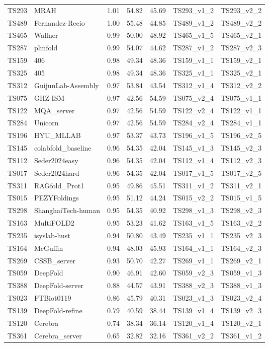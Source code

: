 \begin{table}[ht]
{\begin{tabular}{llrrrll}
TS293 & MRAH & 1.01 & 54.82 & 45.69 & TS293\_v1\_2 & TS293\_v2\_2 \\ 
TS489 & Fernandez-Recio & 1.00 & 55.48 & 44.85 & TS489\_v1\_2 & TS489\_v2\_2 \\ 
TS465 & Wallner & 0.99 & 50.00 & 48.92 & TS465\_v1\_5 & TS465\_v2\_1 \\ 
TS287 & plmfold & 0.99 & 54.07 & 44.62 & TS287\_v1\_2 & TS287\_v2\_3 \\ 
TS159 & 406 & 0.98 & 49.34 & 48.36 & TS159\_v1\_1 & TS159\_v2\_1 \\ 
TS325 & 405 & 0.98 & 49.34 & 48.36 & TS325\_v1\_1 & TS325\_v2\_1 \\ 
TS312 & GuijunLab-Assembly & 0.97 & 53.84 & 43.54 & TS312\_v1\_4 & TS312\_v2\_2 \\ 
TS075 & GHZ-ISM & 0.97 & 42.56 & 54.59 & TS075\_v2\_4 & TS075\_v1\_1 \\ 
TS122 & MQA\_server & 0.97 & 42.56 & 54.59 & TS122\_v2\_4 & TS122\_v1\_1 \\ 
TS284 & Unicorn & 0.97 & 42.56 & 54.59 & TS284\_v2\_4 & TS284\_v1\_1 \\ 
TS196 & HYU\_MLLAB & 0.97 & 53.37 & 43.73 & TS196\_v1\_5 & TS196\_v2\_5 \\ 
TS145 & colabfold\_baseline & 0.96 & 54.35 & 42.04 & TS145\_v1\_3 & TS145\_v2\_3 \\ 
TS112 & Seder2024easy & 0.96 & 54.35 & 42.04 & TS112\_v1\_4 & TS112\_v2\_3 \\ 
TS017 & Seder2024hard & 0.96 & 54.35 & 42.04 & TS017\_v1\_5 & TS017\_v2\_5 \\ 
TS311 & RAGfold\_Prot1 & 0.95 & 49.86 & 45.51 & TS311\_v1\_2 & TS311\_v2\_1 \\ 
TS015 & PEZYFoldings & 0.95 & 51.12 & 44.24 & TS015\_v2\_2 & TS015\_v1\_5 \\ 
TS298 & ShanghaiTech-human & 0.95 & 54.35 & 40.92 & TS298\_v1\_3 & TS298\_v2\_3 \\ 
TS163 & MultiFOLD2 & 0.95 & 53.23 & 41.62 & TS163\_v1\_5 & TS163\_v2\_2 \\ 
TS235 & isyslab-hust & 0.94 & 50.80 & 43.49 & TS235\_v1\_1 & TS235\_v2\_3 \\ 
TS164 & McGuffin & 0.94 & 48.03 & 45.93 & TS164\_v1\_1 & TS164\_v2\_3 \\ 
TS269 & CSSB\_server & 0.93 & 50.70 & 42.27 & TS269\_v1\_1 & TS269\_v2\_1 \\ 
TS059 & DeepFold & 0.90 & 46.91 & 42.60 & TS059\_v2\_3 & TS059\_v1\_3 \\ 
TS388 & DeepFold-server & 0.88 & 44.57 & 43.91 & TS388\_v2\_3 & TS388\_v1\_3 \\ 
TS023 & FTBiot0119 & 0.86 & 45.79 & 40.31 & TS023\_v1\_3 & TS023\_v2\_4 \\ 
TS139 & DeepFold-refine & 0.79 & 40.59 & 38.44 & TS139\_v1\_4 & TS139\_v2\_3 \\ 
TS120 & Cerebra & 0.74 & 38.34 & 36.14 & TS120\_v1\_4 & TS120\_v2\_1 \\ 
TS361 & Cerebra\_server & 0.65 & 32.82 & 32.16 & TS361\_v2\_2 & TS361\_v1\_2 \\ 
\bottomrule
\end{tabular}%
}
\end{table}

